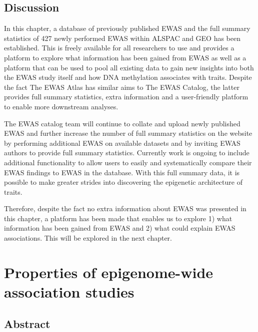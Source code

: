 \documentclass[11pt,oneside]{bristolthesis}
\begin{document}
\hypertarget{discussion-03}{%
\section{Discussion}\label{discussion-03}}

In this chapter, a database of previously published EWAS and the full summary statistics of 427 newly performed EWAS within ALSPAC and GEO has been established. This is freely available for all researchers to use and provides a platform to explore what information has been gained from EWAS as well as a platform that can be used to pool all existing data to gain new insights into both the EWAS study itself and how DNA methylation associates with traits. Despite the fact The EWAS Atlas has similar aims to The EWAS Catalog, the latter provides full summary statistics, extra information and a user-friendly platform to enable more downstream analyses.

The EWAS catalog team will continue to collate and upload newly published EWAS and further increase the number of full summary statistics on the website by performing additional EWAS on available datasets and by inviting EWAS authors to provide full summary statistics. Currently work is ongoing to include additional functionality to allow users to easily and systematically compare their EWAS findings to EWAS in the database. With this full summary data, it is possible to make greater strides into discovering the epigenetic architecture of traits.

Therefore, despite the fact no extra information about EWAS was presented in this chapter, a platform has been made that enables us to explore 1) what information has been gained from EWAS and 2) what could explain EWAS associations. This will be explored in the next chapter.

\hypertarget{properties-of-ewas}{%
\chapter{Properties of epigenome-wide association studies}\label{properties-of-ewas}}

\hypertarget{abstract-04}{%
\section{Abstract}\label{abstract-04}}
\end{document}
